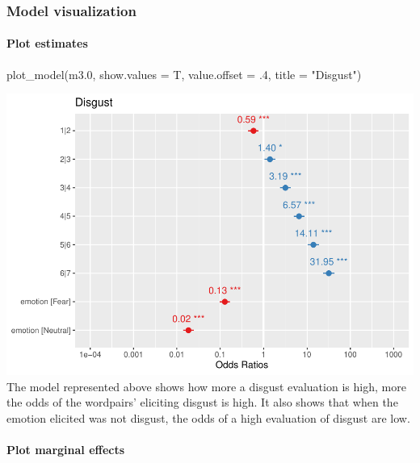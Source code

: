 \documentclass[
]{article}
\newenvironment{Shaded}{\begin{snugshade}}{\end{snugshade}}
\newcommand{\AttributeTok}[1]{\textcolor[rgb]{0.77,0.63,0.00}{#1}}
\newcommand{\DecValTok}[1]{\textcolor[rgb]{0.00,0.00,0.81}{#1}}
\newcommand{\FloatTok}[1]{\textcolor[rgb]{0.00,0.00,0.81}{#1}}
\newcommand{\FunctionTok}[1]{\textcolor[rgb]{0.00,0.00,0.00}{#1}}
\newcommand{\NormalTok}[1]{#1}
\newcommand{\StringTok}[1]{\textcolor[rgb]{0.31,0.60,0.02}{#1}}
\begin{document}
\hypertarget{model-visualization}{%
\subsubsection{Model visualization}\label{model-visualization}}

\hypertarget{plot-estimates}{%
\paragraph{Plot estimates}\label{plot-estimates}}

\begin{Shaded}
\begin{Highlighting}[]
\FunctionTok{plot\_model}\NormalTok{(m3}\FloatTok{.0}\NormalTok{, }\AttributeTok{show.values =}\NormalTok{ T, }\AttributeTok{value.offset =}\NormalTok{ .}\DecValTok{4}\NormalTok{, }\AttributeTok{title =} \StringTok{"Disgust"}\NormalTok{)}
\end{Highlighting}
\end{Shaded}

\includegraphics{DAP_v4-1-22_files/figure-latex/unnamed-chunk-8-1.pdf}
The model represented above shows how more a disgust evaluation is high,
more the odds of the wordpairs' eliciting disgust is high. It also shows
that when the emotion elicited was not disgust, the odds of a high
evaluation of disgust are low.

\hypertarget{plot-marginal-effects}{%
\paragraph{Plot marginal effects}\label{plot-marginal-effects}}
\end{document}
